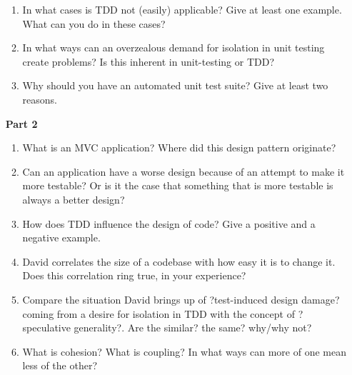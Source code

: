\begin{enumerate}
\begin{enumerate}
			\item In what cases is TDD not (easily) applicable? Give at least one example. What can you do in these cases?
				

			\item In what ways can an overzealous demand for isolation in unit testing create problems? Is this inherent in unit-testing or TDD?
				

			\item Why should you have an automated unit test suite? Give at least two reasons.
							

		\end{enumerate}
	
	\item[\bf{Part 2}]
	
		\begin{enumerate}
			\item What is an MVC application? Where did this design pattern originate?


			\item Can an application have a worse design because of an attempt to make it more testable? Or is it the case that something that is more testable is always a better design?


			\item How does TDD influence the design of code? Give a positive and a negative example.


			\item David correlates the size of a codebase with how easy it is to change it. Does this correlation ring true, in your experience?


			\item Compare the situation David brings up of ?test-induced design damage? coming from a desire for isolation in TDD with the concept of ?speculative generality?. Are the similar? the same? why/why not?


			\item What is cohesion? What is coupling? In what ways can more of one mean less of the other?



\end{enumerate}
\end{enumerate}
